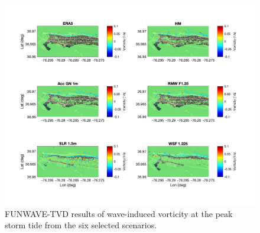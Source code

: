 \documentclass[preprint,12pt,authoryear] {elsarticle}
\begin{document}
\begin{figure}
\centering
\includegraphics[width=\textwidth]{./figures/funwave_vort_6_cases.jpg}
\caption{FUNWAVE-TVD results of wave-induced vorticity  at the peak storm tide from the six selected scenarios.}
\label{funwave_6_cases_setup}
\centering
\end{figure}



%

\end{document}

